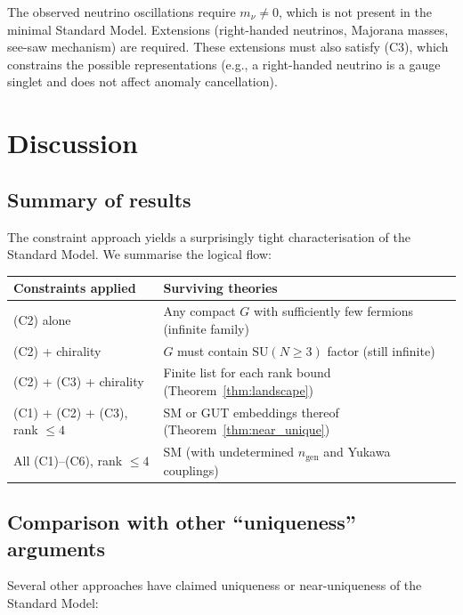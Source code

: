 \documentclass[12pt]{article}
\theoremstyle{definition}
\theoremstyle{remark}
\newcommand{\SU}{\mathrm{SU}}
\begin{document}
The observed neutrino oscillations require $m_\nu \neq 0$,
which is not present in the minimal Standard Model.  Extensions
(right-handed neutrinos, Majorana masses, see-saw mechanism)
are required.  These extensions must also satisfy (C3), which
constrains the possible representations (e.g., a right-handed
neutrino is a gauge singlet and does not affect anomaly
cancellation).

\section{Discussion}
\label{sec:discussion}

\subsection{Summary of results}

The constraint approach yields a surprisingly tight characterisation
of the Standard Model.  We summarise the logical flow:

\begin{center}
\renewcommand{\arraystretch}{1.5}
\begin{tabular}{lp{9cm}}
\toprule
Constraints applied & Surviving theories \\
\midrule
(C2) alone & Any compact $G$ with sufficiently few fermions
  (infinite family) \\
(C2) + chirality & $G$ must contain $\SU(N \geq 3)$ factor
  (still infinite) \\
(C2) + (C3) + chirality & Finite list for each rank bound
  (Theorem~\ref{thm:landscape}) \\
(C1) + (C2) + (C3), rank $\leq 4$ & SM or GUT embeddings thereof
  (Theorem~\ref{thm:near_unique}) \\
All (C1)--(C6), rank $\leq 4$ & SM (with undetermined $n_{\mathrm{gen}}$
  and Yukawa couplings) \\
\bottomrule
\end{tabular}
\end{center}

\subsection{Comparison with other ``uniqueness'' arguments}

Several other approaches have claimed uniqueness or near-uniqueness
of the Standard Model:
\end{document}
